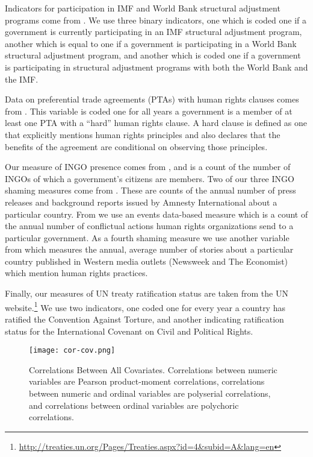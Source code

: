 \documentclass[12pt]{article}
\begin{document}
Indicators for participation in IMF and World Bank structural adjustment programs come from \citet{AbouharbCingranelli2007}. We use three binary indicators, one which is coded one if a government is currently participating in an IMF structural adjustment program, another which is equal to one if a government is participating in a World Bank structural adjustment program, and another which is coded one if a government is participating in structural adjustment programs with both the World Bank and the IMF.

Data on preferential trade agreements (PTAs) with human rights clauses comes from \citet{SpilkerBohmelt2012}. This variable is coded one for all years a government is a member of at least one PTA with a ``hard'' human rights clause. A hard clause is defined as one that explicitly mentions human rights principles and also declares that the benefits of the agreement are conditional on observing those principles. 

Our measure of INGO presence comes from \citet{HafnerBurtonTsutsui2005}, and is a count of the number of INGOs of which a government's citizens are members. Two of our three INGO shaming measures come from \citet{RonRamosRodgers2005}. These are counts of the annual number of press releases and background reports issued by Amnesty International about a particular country. From \citet{MurdieDavis2012} we use an events data-based measure which is a count of the annual number of conflictual actions human rights organizations send to a particular government. As a fourth shaming measure we use another variable from \citet{RonRamosRodgers2005} which measures the annual, average number of stories about a particular country published in Western media outlets (Newsweek and The Economist) which mention human rights practices. 

Finally, our measures of UN treaty ratification status are taken from the UN website.\footnote{\url{http://treaties.un.org/Pages/Treaties.aspx?id=4&subid=A&lang=en}} We use two indicators, one coded one for every year a country has ratified the Convention Against Torture, and another indicating ratification status for the International Covenant on Civil and Political Rights. 

\begin{figure}[!htpb]
\texttt{[image: cor-cov.png]}
\caption{Correlations Between All Covariates. Correlations between numeric variables are Pearson product-moment correlations, correlations between numeric and ordinal variables are polyserial correlations, and correlations between ordinal variables are polychoric correlations.} 
\label{fig:cor-cov}
\end{figure}
\end{document}
